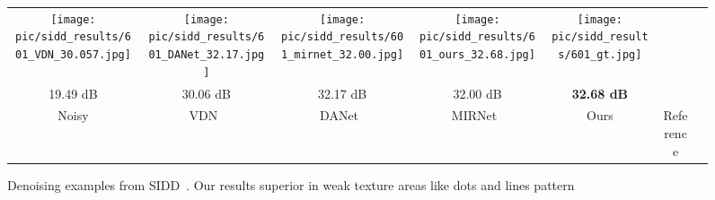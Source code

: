 \documentclass[final]{cvpr}
\begin{document}
\begin{figure*}[h]
{\begin{tabular}[t]{c@{ }c@{ }c@{ }c@{ }c@{ }c@{ }c@{ }}
   \texttt{[image: pic/sidd\_results/601\_VDN\_30.057.jpg]}&  \hspace{-1.4mm}
   \texttt{[image: pic/sidd\_results/601\_DANet\_32.17.jpg]}& \hspace{-1.4mm}
   \texttt{[image: pic/sidd\_results/601\_mirnet\_32.00.jpg]}& \hspace{-1.4mm}
   \texttt{[image: pic/sidd\_results/601\_ours\_32.68.jpg]}&  \hspace{-1.4mm}
    \texttt{[image: pic/sidd\_results/601\_gt.jpg]}
   \vspace{0.2mm}
   \\
   \vspace{0.5mm}
    19.49 dB & 30.06 dB & 32.17 dB & 32.00 dB & \textbf{32.68 dB} &\\
    Noisy
   & VDN~\cite{yue2019variational}  & DANet~\cite{yue2020dual} & MIRNet~\cite{zamir2020learning} & Ours & Reference \\
   \end{tabular}
}
   \vspace{-2mm}
   \caption{\small Denoising examples from SIDD~\cite{abdelhamed2018high}. Our results superior in weak texture areas like dots and lines pattern}
   \label{fig:sidd example}
   
\end{figure*}
\end{document}
